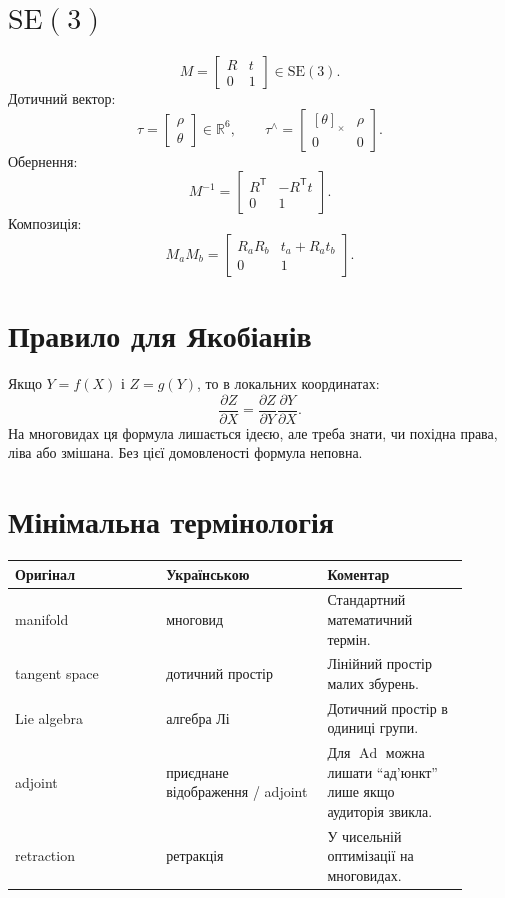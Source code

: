 \documentclass[11pt,a4paper]{article}
\newcommand{\R}{\mathbb{R}}
\newcommand{\T}{^\mathsf{T}}
\newcommand{\SE}{\mathrm{SE}}
\newcommand{\Ad}{\operatorname{Ad}}
\newcommand{\hatmap}[1]{\left[#1\right]_\times}
\begin{document}
\section{$\SE(3)$}

\[
M=
\begin{bmatrix}
R&t\\0&1
\end{bmatrix}\in\SE(3).
\]
Дотичний вектор:
\[
\tau=
\begin{bmatrix}
\rho\\\theta
\end{bmatrix}\in\R^6,\qquad
\tau^\wedge=
\begin{bmatrix}
\hatmap{\theta}&\rho\\0&0
\end{bmatrix}.
\]
Обернення:
\[
M^{-1}=
\begin{bmatrix}
R\T&-R\T t\\0&1
\end{bmatrix}.
\]
Композиція:
\[
M_aM_b=
\begin{bmatrix}
R_aR_b&t_a+R_at_b\\0&1
\end{bmatrix}.
\]

\section{Правило для Якобіанів}

Якщо $Y=f(X)$ і $Z=g(Y)$, то в локальних координатах:
\[
\frac{\partial Z}{\partial X}
=
\frac{\partial Z}{\partial Y}
\frac{\partial Y}{\partial X}.
\]
На многовидах ця формула лишається ідеєю, але треба знати, чи похідна права, ліва або змішана. Без цієї домовленості формула неповна.

\section{Мінімальна термінологія}

\begin{longtable}{p{0.30\linewidth}p{0.32\linewidth}p{0.28\linewidth}}
\toprule
Оригінал & Українською & Коментар\\
\midrule
manifold & многовид & Стандартний математичний термін.\\
tangent space & дотичний простір & Лінійний простір малих збурень.\\
Lie algebra & алгебра Лі & Дотичний простір в одиниці групи.\\
adjoint & приєднане відображення / adjoint & Для $\Ad$ можна лишати ``ад'юнкт'' лише якщо аудиторія звикла.\\
retraction & ретракція & У чисельній оптимізації на многовидах.\\
\bottomrule
\end{longtable}
\end{document}
